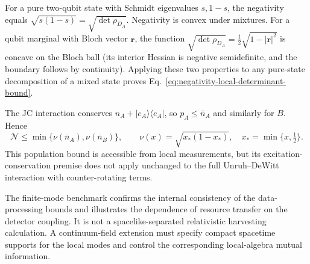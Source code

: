 \documentclass[pdflatex,sn-mathphys-num]{sn-jnl}
\begin{document}
For a pure two-qubit state with Schmidt eigenvalues $s,1-s$, the negativity equals $\sqrt{s(1-s)}=\sqrt{\det\rho_{D_A}}$. Negativity is convex under mixtures. For a qubit marginal with Bloch vector $\boldsymbol r$, the function $\sqrt{\det\rho_{D_A}}=\tfrac12\sqrt{1-|\boldsymbol r|^2}$ is concave on the Bloch ball (its interior Hessian is negative semidefinite, and the boundary follows by continuity). Applying these two properties to any pure-state decomposition of a mixed state proves Eq.~\eqref{eq:negativity-local-determinant-bound}.

The JC interaction conserves $\hat n_A+|e_A\rangle\langle e_A|$, so $p_A\leq\bar n_A$ and similarly for $B$. Hence
\begin{equation}
\mathcal N\leq
\min\{\nu(\bar n_A),\nu(\bar n_B)\},
\qquad
\nu(x)=\sqrt{x_*(1-x_*)},\quad x_*=\min\{x,\tfrac12\}.
\label{eq:mean-energy-negativity-bound}
\end{equation}
This population bound is accessible from local measurements, but its excitation-conservation premise does not apply unchanged to the full Unruh--DeWitt interaction with counter-rotating terms.

The finite-mode benchmark confirms the internal consistency of the data-processing bounds and illustrates the dependence of resource transfer on the detector coupling. It is not a spacelike-separated relativistic harvesting calculation. A continuum-field extension must specify compact spacetime supports for the local modes and control the corresponding local-algebra mutual information.
\end{document}
